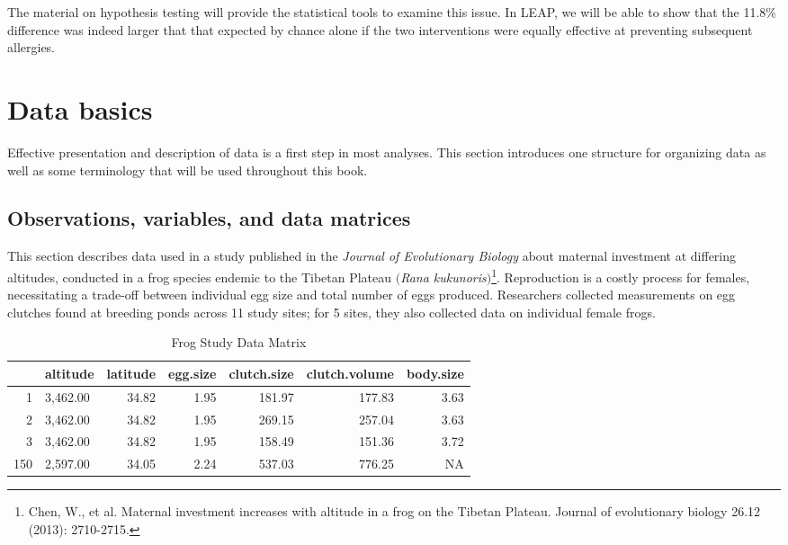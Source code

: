 \begin{doublespace}
The material on hypothesis testing will provide the statistical tools to examine this issue. In LEAP, we will be able to show that the 11.8\% difference was indeed larger that that expected by chance alone if the two interventions were equally effective at preventing subsequent allergies.



\section{Data basics}
\label{dataBasics}

Effective presentation and description of data is a first step in most analyses. This section introduces one structure for organizing data as well as some terminology that will be used throughout this book.


\subsection{Observations, variables, and data matrices}
\label{basicExampleOfFrogAltitude}

This section describes data used in a study published in the \textit{Journal of Evolutionary Biology} about maternal investment at differing altitudes, conducted in a frog species endemic to the Tibetan Plateau $($\textit{Rana kukunoris}$)$\footnote{ Chen, W., et al. Maternal investment increases with altitude in a frog on the Tibetan Plateau. Journal of evolutionary biology 26.12 (2013): 2710-2715.}. Reproduction is a costly process for females, necessitating a trade-off between individual egg size and total number of eggs produced. Researchers collected measurements on egg clutches found at breeding ponds across 11 study sites; for 5 sites, they also collected data on individual female frogs.

\begin{table}[ht]
\centering
\begin{tabular}{rlrrrrr}
  \hline
 & altitude & latitude & egg.size & clutch.size & clutch.volume & body.size \\ 
  \hline
1 & 3,462.00 & 34.82 & 1.95 & 181.97 & 177.83 & 3.63 \\ 
  2 & 3,462.00 & 34.82 & 1.95 & 269.15 & 257.04 & 3.63 \\ 
  3 & 3,462.00 & 34.82 & 1.95 & 158.49 & 151.36 & 3.72 \\ 
  150 & 2,597.00 & 34.05 & 2.24 & 537.03 & 776.25 & NA \\ 
   \hline
\end{tabular}
\caption{Frog Study Data Matrix} 
\label{FrogAltitudeDF}
\end{table}


\end{doublespace}
